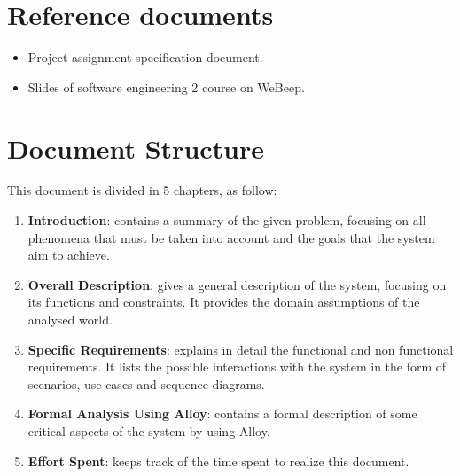\section{Reference documents}
\begin{itemize}
	\item Project assignment specification document.
	\item Slides of software engineering 2 course on WeBeep.
\end{itemize}

\section{Document Structure}
This document is divided in 5 chapters, as follow:
\begin{enumerate}
	\item \textbf{Introduction}: contains a summary of the given problem, focusing on all phenomena that must be taken into account and the goals that the system aim to achieve.

	\item \textbf{Overall Description}: gives a general description of the system, focusing on its functions and constraints. It provides the domain assumptions of the analysed world.

	\item \textbf{Specific Requirements}: explains in detail the functional and non functional requirements. It lists the possible interactions with the system in the form of scenarios, use cases and sequence diagrams.

	\item \textbf{Formal Analysis Using Alloy}: contains a formal description of some critical aspects of the system by using Alloy.

	\item \textbf{Effort Spent}: keeps track of the time spent to realize this document.
\end{enumerate}
